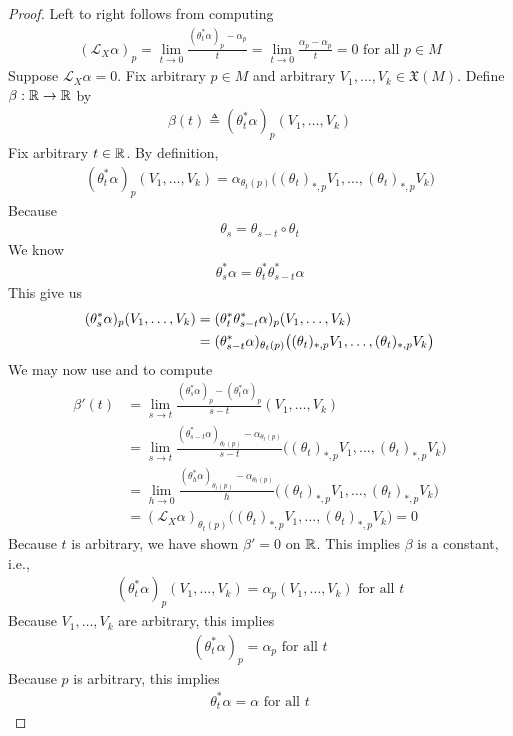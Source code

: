 \documentclass{report}
\begin{document}
\begin{proof}
Left to right follows from computing 
\begin{align*}
  (\mathcal{L}_X \alpha)_p = \lim_{t\to 0} \frac{(\theta_t^*\alpha )_p -\alpha _p}{t} = \lim_{t\to 0} \frac{\alpha_p -\alpha _p}{t}= 0\text{ for all }p \in M
\end{align*}
Suppose $\mathcal{L}_X \alpha =0$. Fix arbitrary $p \in M$ and arbitrary $V_1,\dots ,V_k \in \mathfrak{X}(M)$. Define $\beta :\mathbb{R}\rightarrow \mathbb{R}$ by 
\begin{align*}
\beta  (t)\triangleq  (\theta_t^* \alpha )_p (V_1,\dots ,V_k)
\end{align*}
Fix arbitrary $t\in\mathbb{R}$. By definition, 
\begin{align}
\label{11}
  (\theta_t^* \alpha )_p (V_1,\dots ,V_k)= \alpha_{\theta_t (p)}\big( (\theta_t)_{*,p}V_1,\dots ,(\theta_t)_{*,p}V_k  \big) 
\end{align}
Because  
\begin{align*}
\theta_s= \theta_{s-t} \circ \theta_{t}
\end{align*}
We know 
\begin{align*}
\theta_s^*\alpha  = \theta_{t}^*  \theta_{s-t}^*\alpha 
\end{align*}
This give us 
\begin{align}
  (\theta_s ^* \alpha )_p (V_1,\dots ,V_k)&=  (\theta_{t}^*\theta_{s-t}^*\alpha )_p (V_1,\dots ,V_k) \notag   \\
  &=(\theta_{s-t}^*\alpha)_{\theta_{t}(p )} \big( (\theta_{t})_{*,p}V_1,\dots ,(\theta_{t})_{*,p}V_k  \big)  \label{12}
\end{align}
We may now use  and  to compute 
\begin{align*}
\beta  '(t)&=\lim_{s\to t} \frac{(\theta_s^* \alpha)_p - (\theta_t^* \alpha )_p }{s-t} (V_1,\dots ,V_k) \\
&=\lim_{s\to t} \frac{ (\theta_{s-t}^*\alpha )_{\theta_t(p)}-\alpha_{\theta_t (p)}}{s-t}  \big( (\theta_{t})_{*,p}V_1,\dots ,(\theta_{t})_{*,p}V_k  \big)  \\
&= \lim_{h\to 0} \frac{(\theta_h^* \alpha)_{\theta_t (p)}- \alpha_{\theta_t (p)} }{h}    \big( (\theta_{t})_{*,p}V_1,\dots ,(\theta_{t})_{*,p}V_k  \big)  \\
&= (\mathcal{L}_X \alpha)_{\theta_t (p)}     \big( (\theta_{t})_{*,p}V_1,\dots ,(\theta_{t})_{*,p}V_k  \big)=0 
\end{align*}
Because $t$ is arbitrary, we have shown $\beta '=0$ on $\mathbb{R}$. This implies  $\beta $ is a constant, i.e., 
\begin{align*}
  (\theta_t^* \alpha )_p (V_1,\dots ,V_k)= \alpha _p (V_1,\dots ,V_k)\text{ for all }t
\end{align*}
Because $V_1,\dots ,V_k$ are arbitrary, this implies 
\begin{align*}
  (\theta_t^* \alpha)_p = \alpha_p  \text{ for all }t
\end{align*}
Because $p$ is arbitrary, this implies  
\begin{align*}
  \theta_t^* \alpha =\alpha \text{ for all }t
\end{align*}
\end{proof}
\end{document}
